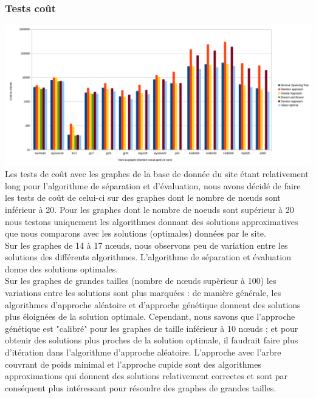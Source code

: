 \documentclass[10pt,a4paper]{report}
\begin{document}
	\subsubsection{Tests coût}
			\includegraphics[scale=0.45]{./Ressource/cout_graphes_site.png}
			Les tests de coût avec les graphes de la base de donnée du site étant relativement long pour l'algorithme de séparation et d'évaluation, nous avons décidé de faire les tests de coût de celui-ci sur des graphes dont le nombre de nœuds sont inférieur à 20. Pour les graphes dont le nombre de noeuds sont supérieur à 20 nous testons uniquement les algorithmes donnant des solutions approximatives que nous comparons avec les solutions (optimales) données par le site.\\
			Sur les graphes de 14 à 17 nœuds, nous observons peu de variation entre les solutions des différents algorithmes. L'algorithme de séparation et évaluation donne des solutions optimales.\\
			Sur les graphes de grandes tailles (nombre de nœuds supèrieur à 100) les variations entre les solutions sont plus marquées  : de manière générale, les algorithmes d'approche aléatoire et d'approche génétique donnent des solutions plus éloignées de la solution optimale. Cependant, nous savons que  l'approche génétique est "calibré" pour les graphes de taille inférieur à 10 nœuds ;  et pour obtenir des solutions plus proches de la solution optimale, il faudrait faire plus d'itération dans l'algorithme d'approche aléatoire.
			L'approche avec l'arbre couvrant de poids minimal et l'approche cupide sont des algorithmes approximations qui donnent des solutions relativement correctes et sont par conséquent plus intéressant pour résoudre des graphes de grandes tailles.
\end{document}

